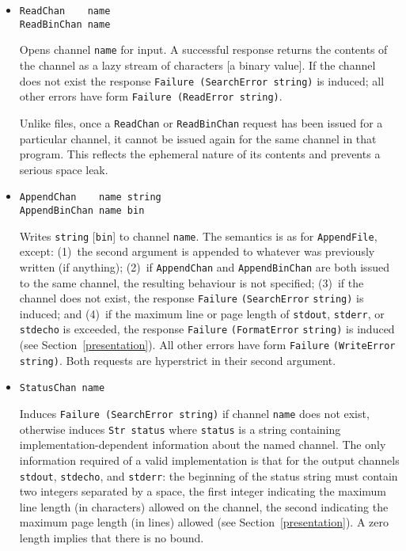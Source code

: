 \begin{itemize}
\item
\mbox{\tt ReadChan\ \ \ \ name}\\
\mbox{\tt ReadBinChan\ name}

Opens channel \mbox{\tt name} for input.  A successful response
returns the contents of the channel as a lazy stream of characters [a binary
value].  If the channel does not exist the response 
\mbox{\tt Failure\ (SearchError\ string)} is induced; all other errors have form
\mbox{\tt Failure\ (ReadError\ string)}.

Unlike files, once a \mbox{\tt ReadChan} or \mbox{\tt ReadBinChan} request has been
issued for a particular channel, it cannot be issued again for the
same channel in that program.  This reflects the ephemeral nature of
its contents and prevents a serious space leak.

\item
\mbox{\tt AppendChan\ \ \ \ name\ string}\\
\mbox{\tt AppendBinChan\ name\ bin}

Writes \mbox{\tt string} [\mbox{\tt bin}] to channel
\mbox{\tt name}.  The semantics is as for \mbox{\tt AppendFile}, except:
(1)~the second argument is appended to whatever was
previously written (if anything); (2)~if \mbox{\tt AppendChan} and
\mbox{\tt AppendBinChan} are both issued to the same channel, the resulting
behaviour is not specified; (3)~if the channel does not exist, the
response \mbox{\tt Failure} \mbox{\tt (SearchError} \mbox{\tt string)} is induced; and (4)~if the
maximum line or page length of \mbox{\tt stdout}, \mbox{\tt stderr}, or \mbox{\tt stdecho} is
exceeded, the response \mbox{\tt Failure} \mbox{\tt (FormatError} \mbox{\tt string)} is induced (see
Section~\ref{presentation}).  All other errors have form 
\mbox{\tt Failure} \mbox{\tt (WriteError} \mbox{\tt string)}.
Both requests are hyperstrict in their second argument.

\item
\mbox{\tt StatusChan\ name}

Induces \mbox{\tt Failure\ (SearchError\ string)} if channel \mbox{\tt name}
does not exist, otherwise induces \mbox{\tt Str\ status} where \mbox{\tt status} is a
string containing implementation-dependent information about the named
channel.  The only information required of a valid implementation is
that for the output channels \mbox{\tt stdout}, \mbox{\tt stdecho}, and \mbox{\tt stderr}: the
beginning of the status string must contain two integers separated by
a space, the first integer indicating the maximum line length (in
characters) allowed on the channel, the second indicating the maximum
page length (in lines) allowed (see Section~\ref{presentation}).
A zero length implies that there is no bound.

\end{itemize}

